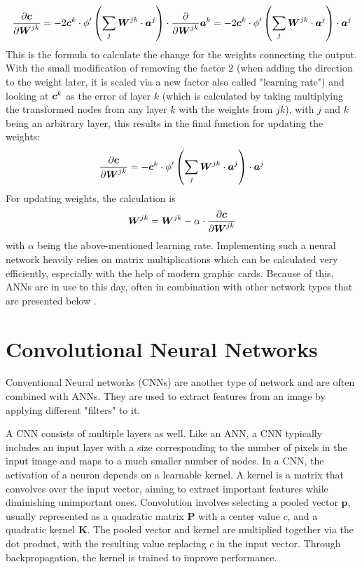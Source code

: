 \begin{equation}
\frac{\partial{\boldsymbol{c}}}{\partial{\boldsymbol{W}^{jk}}}
= -2\boldsymbol{c}^{k} \cdot \phi'\left(\sum_j \boldsymbol{W}^{jk} \cdot \boldsymbol{a}^j\right) \cdot \frac{\partial}{\partial{\boldsymbol{W}^{jk}}} \boldsymbol{a}^k 
= -2\boldsymbol{c}^{k} \cdot \phi'\left(\sum_j \boldsymbol{W}^{jk} \cdot \boldsymbol{a}^j\right) \cdot \boldsymbol{a}^j
\end{equation}
This is the formula to calculate the change for the weights connecting the output. With the small modification of removing the factor $2$ (when adding the direction to the weight later, it is scaled via a new factor also called "learning rate") and looking at $\boldsymbol{c}^k$ as the error of layer $k$ (which is calculated by taking multiplying the transformed nodes from any layer $k$ with the weights from $jk$), with $j$ and $k$ being an arbitrary layer, this results in the final function for updating the weights:
\begin{equation}
\frac{\partial{\boldsymbol{c}}}{\partial{\boldsymbol{W}^{jk}}}
= -\boldsymbol{c}^{k} \cdot \phi'\left(\sum_j \boldsymbol{W}^{jk} \cdot \boldsymbol{a}^j\right) \cdot \boldsymbol{a}^{j}
\end{equation}
For updating weights, the calculation is
\begin{equation}
\boldsymbol{W}^{jk} = \boldsymbol{W}^{jk} - \alpha \cdot \frac{\partial{\boldsymbol{c}}}{\partial{\boldsymbol{W}^{jk}}} 
\end{equation}
with $\alpha$ being the above-mentioned learning rate. Implementing such a neural network heavily relies on matrix multiplications which can be calculated very efficiently, especially with the help of modern graphic cards. Because of this, ANNs are in use to this day, often in combination with other network types that are presented below \cite{yolox2021} \cite{vaswani2023attentionneed}.

\section{Convolutional Neural Networks}
Conventional Neural networks (CNNs) \cite{oshea2015introductionconvolutionalneuralnetworks} are another type of network and are often combined with ANNs. They are used to extract features from an image by applying different "filters" to it. 

A CNN consists of multiple layers as well. Like an ANN, a CNN typically includes an input layer with a size corresponding to the number of pixels in the input image and maps to a much smaller number of nodes. In a CNN, the activation of a neuron depends on a learnable kernel. A kernel is a matrix that convolves over the input vector, aiming to extract important features while diminishing unimportant ones. Convolution involves selecting a pooled vector $\boldsymbol{p}$, usually represented as a quadratic matrix $\boldsymbol{P}$ with a center value $c$, and a quadratic kernel $\boldsymbol{K}$. The pooled vector and kernel are multiplied together via the dot product, with the resulting value replacing $c$ in the input vector. Through backpropagation, the kernel is trained to improve performance. \cite{oshea2015introductionconvolutionalneuralnetworks}

